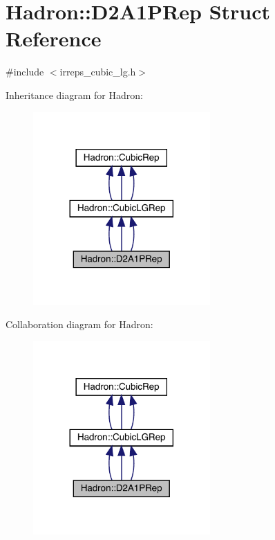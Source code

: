 \hypertarget{structHadron_1_1D2A1PRep}{}\section{Hadron\+:\+:D2\+A1\+P\+Rep Struct Reference}
\label{structHadron_1_1D2A1PRep}


{\ttfamily \#include $<$irreps\+\_\+cubic\+\_\+lg.\+h$>$}



Inheritance diagram for Hadron\+:
\nopagebreak
\begin{figure}[H]
\begin{center}
\leavevmode
\includegraphics[width=192pt]{db/d77/structHadron_1_1D2A1PRep__inherit__graph}
\end{center}
\end{figure}


Collaboration diagram for Hadron\+:
\nopagebreak
\begin{figure}[H]
\begin{center}
\leavevmode
\includegraphics[width=192pt]{dc/d1c/structHadron_1_1D2A1PRep__coll__graph}
\end{center}
\end{figure}
